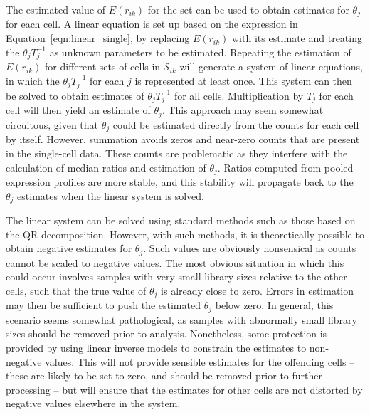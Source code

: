 \documentclass{article}
\begin{document}
The estimated value of $E(r_{ik})$ for the set can be used to obtain estimates for $\theta_j$ for each cell.
A linear equation is set up based on the expression in Equation~\ref{eqn:linear_single}, 
by replacing $E(r_{ik})$ with its estimate and treating the $\theta_j T_j^{-1}$ as unknown parameters to be estimated.
Repeating the estimation of $E(r_{ik})$ for different sets of cells in $\mathcal{S}_{ik}$ will generate a system of linear equations, 
    in which the $\theta_j T_j^{-1}$ for each $j$ is represented at least once.
This system can then be solved to obtain estimates of $\theta_j T_j^{-1}$ for all cells.
Multiplication by $T_j$ for each cell will then yield an estimate of $\theta_j$.
This approach may seem somewhat circuitous, given that $\theta_j$ could be estimated directly from the counts for each cell by itself.
However, summation avoids zeros and near-zero counts that are present in the single-cell data.
These counts are problematic as they interfere with the calculation of median ratios and estimation of $\theta_j$.
Ratios computed from pooled expression profiles are more stable, and this stability will propagate back to the $\theta_j$ estimates when the linear system is solved.

The linear system can be solved using standard methods such as those based on the QR decomposition.
However, with such methods, it is theoretically possible to obtain negative estimates for $\theta_j$.
Such values are obviously nonsensical as counts cannot be scaled to negative values.
The most obvious situation in which this could occur involves samples with very small library sizes relative to the other cells, 
    such that the true value of $\theta_j$ is already close to zero.
Errors in estimation may then be sufficient to push the estimated $\theta_j$ below zero.
In general, this scenario seems somewhat pathological, as samples with abnormally small library sizes should be removed prior to analysis.
Nonetheless, some protection is provided by using linear inverse models \cite{soetaert2009limsolve} to constrain the estimates to non-negative values.
This will not provide sensible estimates for the offending cells -- these are likely to be set to zero, and should be removed prior to further processing --
    but will ensure that the estimates for other cells are not distorted by negative values elsewhere in the system.
    
\end{document}
